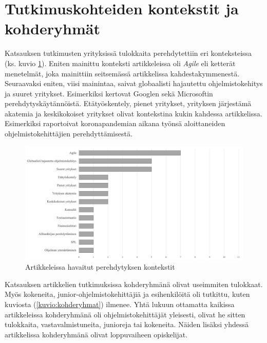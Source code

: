 \documentclass[utf8]{gradu3}
\begin{document}

\section{Tutkimuskohteiden kontekstit ja kohderyhmät}
\label{luku-tulokset-kontekstit-kohderyhmät}

Katsauksen tutkimusten yrityksissä tulokkaita perehdytettiin eri konteksteissa (ks. kuvio \ref{kuvio:kontekstit}). Eniten mainittu konteksti artikkeleissa oli \textit{Agile} eli ketterät menetelmät, joka mainittiin seitsemässä artikkelissa kahdestakymmenestä. Seuraavaksi eniten, viisi mainintaa, saivat globaalisti hajautettu ohjelmistokehitys ja suuret yritykset. Esimerkiksi \textcite{johnson-senges-2010} kertovat Googlen sekä \textcite{rodeghero-ym-2021} \textcite{ju-ym-2021} Microsoftin perehdytyskäytännöistä. Etätyöskentely, pienet yritykset, yrityksen järjestämä akatemia ja keskikokoiset yritykset olivat kontekstina kukin kahdessa artikkelissa. Esimerkiksi \textcite{rodeghero-ym-2021} raportoivat koronapandemian aikana työnsä aloittaneiden ohjelmistokehittäjien perehdyttämisestä.

\begin{figure}[h]
    \centering
    \includegraphics[width=\textwidth]{media/kontekstit.png}
    \caption{Artikkeleissa havaitut perehdytyksen kontekstit}
    \label{kuvio:kontekstit}
\end{figure}

Katsauksen artikkelien tutkimuksissa kohderyhmänä olivat useimmiten tulokkaat. Myös kokeneita, junior-ohjelmistokehittäjiä ja esihenkilöitä oli tutkittu, kuten kuviosta (\ref{kuvio:kohderyhmat}) ilmenee. Yhtä lukuun ottamatta kaikissa artikkeleissa kohderyhmänä oli ohjelmistokehittäjät yleisesti, olivat he sitten tulokkaita, vastavalmistuneita, junioreja tai kokeneita. Näiden lisäksi yhdessä artikkelissa kohderyhmänä olivat loppuvaiheen opiskelijat.
\end{document}
